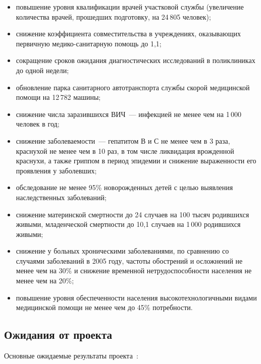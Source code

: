 \documentclass[article, 12pt, russian, oneside]{ncc}
\begin{document}
\begin{itemize}
\item повышение уровня квалификации врачей участковой службы
  (увеличение количества врачей, прошедших подготовку, на 24\,805
  человек);
\item снижение коэффициента совместительства в учреждениях,
  оказывающих первичную медико-санитарную помощь до 1,1;
\item сокращение сроков ожидания диагностических исследований в
  поликлиниках до одной недели;
\item обновление парка санитарного автотранспорта службы скорой
  медицинской помощи на 12\,782 машины;
\item снижение числа заразившихся ВИЧ~--- инфекцией не менее чем на
  1\,000 человек в год;
\item снижение заболеваемости~--- гепатитом В и С не менее чем в 3
  раза, краснухой не менее чем в 10 раз, в том числе ликвидация
  врожденной краснухи, а также гриппом в период эпидемии и снижение
  выраженности его проявления у заболевших;
\item обследование не менее 95\% новорожденных детей с целью выявления
  наследственных заболеваний;
\item снижение материнской смертности до 24 случаев на 100 тысяч
  родившихся живыми, младенческой смертности до 10,1 случаев на 1\,000
  родившихся живыми;
\item снижение у больных хроническими заболеваниями, по сравнению со
  случаями заболеваний в 2005 году, частоты обострений и осложнений не
  менее чем на 30\% и снижение временной нетрудоспособности населения
  не менее чем на 20\%;
\item повышение уровня обеспеченности населения высокотехнологичными
  видами медицинской помощи не менее чем до 45\% потребности.
\end{itemize}

\subsection{Ожидания от проекта}

Основные ожидаемые результаты проекта~\cite{Health_Waitings}:
\end{document}
